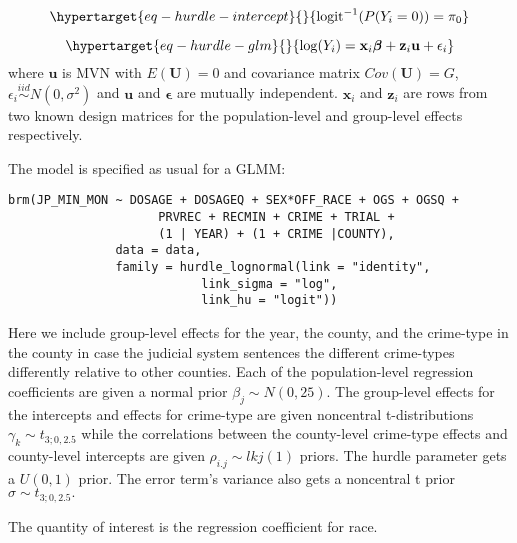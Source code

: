 \documentclass[
  letterpaper,
  DIV=11,
  numbers=noendperiod]{scrartcl}
\begin{document}
\begin{equation}\protect\hypertarget{eq-hurdle-intercept}{}{
\mathrm{logit}^{-1}(P(Y_i = 0)) = \pi_0
}\label{eq-hurdle-intercept}\end{equation}

\begin{equation}\protect\hypertarget{eq-hurdle-glm}{}{
\log(Y_i) = \mathbf{x}_i \boldsymbol{\beta} + \mathbf{z}_i \mathbf{u} + \epsilon_i
}\label{eq-hurdle-glm}\end{equation} where \(\mathbf{u}\) is MVN with
\(E(\mathbf{U}) = 0\) and covariance matrix \(Cov(\mathbf{U}) = G\),
\(\epsilon_i \overset{iid}{\sim} N(0, \sigma^2)\) and \(\mathbf{u}\) and
\(\boldsymbol{\epsilon}\) are mutually independent. \(\mathbf{x}_i\) and
\(\mathbf{z}_i\) are rows from two known design matrices for the
population-level and group-level effects respectively.

The model is specified as usual for a GLMM:

\begin{verbatim}
brm(JP_MIN_MON ~ DOSAGE + DOSAGEQ + SEX*OFF_RACE + OGS + OGSQ +
                     PRVREC + RECMIN + CRIME + TRIAL +
                     (1 | YEAR) + (1 + CRIME |COUNTY),
               data = data,
               family = hurdle_lognormal(link = "identity",
                           link_sigma = "log",
                           link_hu = "logit"))
\end{verbatim}

Here we include group-level effects for the year, the county, and the
crime-type in the county in case the judicial system sentences the
different crime-types differently relative to other counties. Each of
the population-level regression coefficients are given a normal prior
\(\beta_j \sim N(0, 25).\) The group-level effects for the intercepts
and effects for crime-type are given noncentral t-distributions
\(\gamma_k \sim t_{3; 0, 2.5}\) while the correlations between the
county-level crime-type effects and county-level intercepts are given
\(\rho_{i.j} \sim lkj(1)\) priors. The hurdle parameter gets a
\(U(0,1)\) prior. The error term's variance also gets a noncentral t
prior \(\sigma \sim t_{3; 0, 2.5}.\)

The quantity of interest is the regression coefficient for race.
\end{document}

